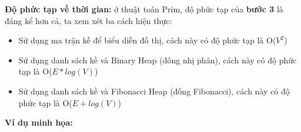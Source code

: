 \documentclass[a4paper]{article}
\begin{document}
\textbf{Độ phức tạp về thời gian:} ở thuật toán Prim, độ phức tạp của \textbf{bước 3} là đáng kể hơn cả, ta xem xét ba cách hiện thực:
\begin{itemize}
    \item Sử dụng ma trận kề để biểu diễn đồ thị, cách này có độ phức tạp là O($V^2$) 
    \item Sử dụng danh sách kề và Binary Heap (đống nhị phân), cách này có độ phức tạp là O($E*log(V)$)
    \item Sử dụng danh sách kề và Fibonacci Heap (đống Fibonacci), cách này có độ phức tạp là O($E+log(V)$)
\end{itemize}

\textbf{Ví dụ minh họa:} \\

\begin{center}
    


\begin{tikzpicture}[x=0.75pt,y=0.75pt,yscale=-1,xscale=1]


\end{tikzpicture}
\end{center}
\end{document}
